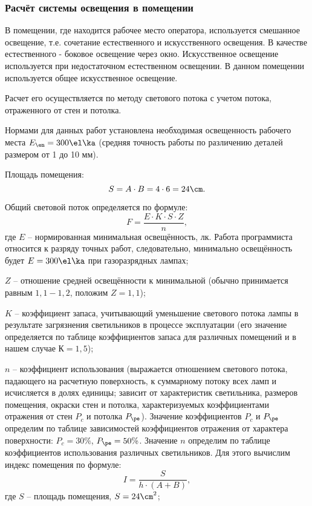 \subsubsection{Расчёт системы освещения в помещении}

В помещении, где находится рабочее место оператора, используется смешанное освещение,  т.е. сочетание естественного и искусственного освещения. В качестве естественного - боковое освещение через окно. Искусственное освещение используется при недостаточном естественном освещении. В данном помещении используется общее искусственное освещение.

Расчет его осуществляется по методу светового потока с учетом потока, отраженного от стен и потолка.

Нормами для данных работ установлена необходимая освещенность рабочего места $E_{\en}=300\el\ka$ (средняя точность работы по различению деталей размером от 1 до 10 мм). 

Площадь помещения:
\begin{equation*}
	S = A \cdot B = 4 \cdot 6 = 24 \cm.
\end{equation*}

Общий световой поток определяется по формуле:
\begin{equation*}
	F = \frac{E \cdot K \cdot S \cdot Z}{n},
\end{equation*}
где $E$ -- нормированная минимальная освещённость, лк. Работа программиста относится к разряду точных работ, следовательно, минимально освещённость будет $E = 300 \el\ka$ при газоразрядных лампах;

$Z$ -- отношение средней освещённости к минимальной (обычно принимается равным $1,1-1,2$, положим $Z = 1,1$);

$K$ -- коэффициент запаса, учитывающий уменьшение светового потока лампы в результате загрязнения светильников в процессе эксплуатации (его значение определяется по таблице коэффициентов запаса для различных помещений и в нашем случае $К = 1,5$);

$n$ -- коэффициент использования (выражается отношением светового потока, падающего на расчетную поверхность, к суммарному потоку всех ламп и исчисляется в долях единицы; зависит от характеристик светильника, размеров помещения, окраски стен и потолка, характеризуемых коэффициентами отражения от стен $P_c$ и потолка $P_{\pe}$). Значение коэффициентов $P_c$ и $P_{\pe}$ определим по таблице зависимостей коэффициентов отражения от характера поверхности: $P_c=30\%$, $P_{\pe}=50\%$. Значение $n$ определим по таблице коэффициентов использования различных светильников. Для этого вычислим индекс помещения по формуле:
\begin{equation*}
	I = \frac{S}{h \cdot (A + B)},
\end{equation*}
где $S$ -- площадь помещения, $S = 24 \cm^2$;

